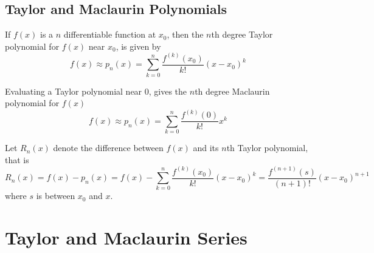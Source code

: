 \documentclass{article}
\begin{document}
\subsection{Taylor and Maclaurin Polynomials}
\begin{theorem}
    If $f(x)$ is a $n$ differentiable function at $x_0$, then the $n$th degree
    Taylor polynomial for $f(x)$ near $x_0$, is given by
    \begin{equation*}
        f(x) \approx p_n(x) = \sum_{k=0}^n \frac{f^{\left( k \right)}(x_0)}{k!} \left( x-x_0 \right)^k
    \end{equation*}
\end{theorem}
\begin{theorem}
    Evaluating a Taylor polynomial near $0$, gives the $n$th degree Maclaurin
    polynomial for $f(x)$
    \begin{equation*}
        f(x) \approx p_n(x) = \sum_{k=0}^n \frac{f^{\left( k \right)}(0)}{k!} x^k
    \end{equation*}
\end{theorem}
\begin{theorem}
    Let $R_n(x)$ denote the difference between $f(x)$ and its $n$th Taylor
    polynomial, that is
    \begin{equation*}
        R_n(x) = f(x) - p_n(x) = f(x) - \sum_{k=0}^n \frac{f^{\left( k \right)}(x_0)}{k!} \left( x-x_0 \right)^k = \frac{f^{\left( n+1 \right)}(s)}{\left( n+1 \right)!} \left( x-x_0 \right)^{n+1}
    \end{equation*}
    where $s$ is between $x_0$ and $x$.
\end{theorem}
\newpage
\section{Taylor and Maclaurin Series}
\end{document}
